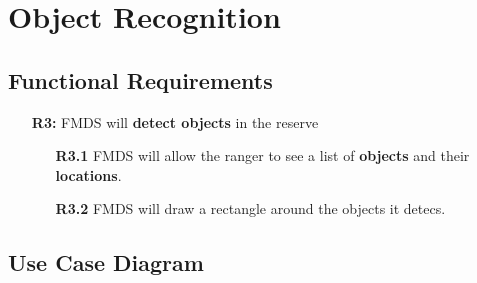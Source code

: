 \section{ Object Recognition }
\subsection{Functional Requirements}
	\begin{flushleft}
		\begin{itemize}
			\item  [\textbf{R3:}] FMDS will \textbf{detect objects} in the reserve

				\begin{itemize}
					\item [\textbf{R3.1}] FMDS will allow the ranger to see a list of \textbf{objects} and their \textbf{locations}.
					\item [\textbf{R3.2}] FMDS will draw a rectangle around the objects it detecs.
				\end{itemize}
		\end{itemize}
	\end{flushleft}

\subsection{Use Case Diagram}


